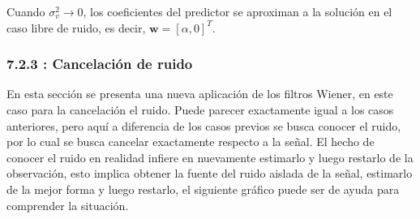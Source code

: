 \documentclass[a4paper]{article}
\begin{document}
Cuando $\sigma_v^2 \rightarrow 0$, los coeficientes del predictor se aproximan a la solución en el caso libre de ruido, es decir, $\mathbf{w} = [\alpha, 0]^T$.

 \subsubsection*{7.2.3 : Cancelación de ruido }
 
 
 
 En esta sección se presenta una nueva aplicación de los filtros Wiener, en este caso para la cancelación el ruido. Puede parecer exactamente igual a los casos anteriores, pero aquí a diferencia de los casos previos se busca conocer el ruido, por lo cual se busca cancelar exactamente respecto a la señal. El hecho de conocer el ruido en realidad infiere en nuevamente estimarlo y luego restarlo de la observación, esto implica obtener la fuente del ruido aislada de la señal, estimarlo de la mejor forma y luego restarlo, el siguiente gráfico puede ser de ayuda para comprender la situación.
\end{document}
